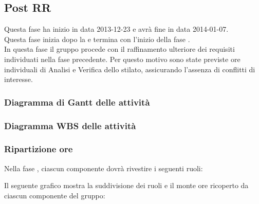 \subsection{Post RR}
Questa fase ha inizio in data 2013-12-23 e avrà fine in data 2014-01-07.\\
Questa fase inizia dopo la  e termina con l'inizio della fase .\\
In questa fase il gruppo procede con il raffinamento ulteriore dei requisiti individuati nella fase precedente. Per questo motivo sono state previste ore individuali di Analisi e Verifica dello stilato, assicurando l'assenza di conflitti di interesse.

\subsubsection{Diagramma di Gantt delle attività}

\newpage
\subsubsection{Diagramma WBS delle attività}

\newpage
\subsubsection{Ripartizione ore}

\newpage
Nella fase , ciascun componente dovrà rivestire i seguenti ruoli:

Il seguente grafico mostra la suddivisione dei ruoli e il monte ore ricoperto da ciascun componente del gruppo:
